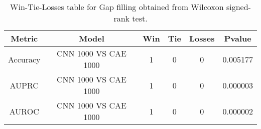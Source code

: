 \begin{table}[H]
\centering
\begin{tabular}{|c|c|c|c|c|c|}

\textbf{Metric} &        \textbf{Model} &  \textbf{Win} &  \textbf{Tie} &  \textbf{Losses} &  \textbf{Pvalue} \\
\hline

       Accuracy &  CNN 1000 VS CAE 1000 &             1 &             0 &                0 &         0.005177 \\
\hline
          AUPRC &  CNN 1000 VS CAE 1000 &             1 &             0 &                0 &         0.000003 \\
\hline
          AUROC &  CNN 1000 VS CAE 1000 &             1 &             0 &                0 &         0.000002 \\
\hline

\end{tabular}
\caption{Win-Tie-Losses table for Gap filling obtained from Wilcoxon signed-rank test.}
\label{tab:gap_filling_best_models_comparison}
\end{table}